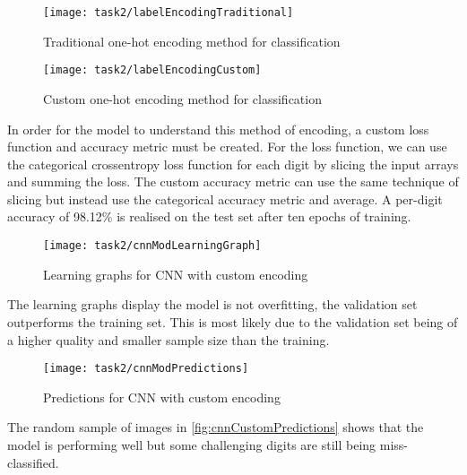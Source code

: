 \begin{figure}[!htbp]
    \centering
    \texttt{[image: task2/labelEncodingTraditional]}
    \caption[Traditional one-hot encoding method for classification]
    {Traditional one-hot encoding method for classification}
    \label{fig:oneHotEncoding}
\end{figure}

\begin{figure}[!htbp]
    \centering
    \texttt{[image: task2/labelEncodingCustom]}
    \caption[Custom one-hot encoding method for classification]
    {Custom one-hot encoding method for classification}
    \label{fig:customOneHotEncoding}
\end{figure}

In order for the model to understand this method of encoding, a custom loss function and accuracy metric must be created. For the loss function, we can use the categorical crossentropy loss function for each digit by slicing the input arrays and summing the loss. The custom accuracy metric can use the same technique of slicing but instead use the categorical accuracy metric and average. A per-digit accuracy of 98.12\% is realised on the test set after ten epochs of training.

\begin{figure}[!htbp]
    \centering
    \texttt{[image: task2/cnnModLearningGraph]}
    \caption[Learning graphs for CNN with custom encoding]
    {Learning graphs for CNN with custom encoding}
    \label{fig:cnnCustomLearning}
\end{figure}

The learning graphs display the model is not overfitting, the validation set outperforms the training set. This is most likely due to the validation set being of a higher quality and smaller sample size than the training.

\begin{figure}[!htbp]
    \centering
    \texttt{[image: task2/cnnModPredictions]}
    \caption[Predictions for CNN with custom encoding]
    {Predictions for CNN with custom encoding}
    \label{fig:cnnCustomPredictions}
\end{figure}

The random sample of images in \autoref{fig:cnnCustomPredictions} shows that the model is performing well but some challenging digits are still being miss-classified.

